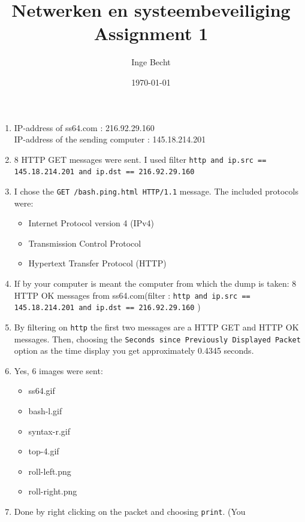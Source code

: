 \documentclass[12pt]{article} %
\begin{document}
\title{Netwerken en systeembeveiliging\\ Assignment 1}
\author{Inge Becht}
\date{\today}

\maketitle
 \begin{enumerate}
     \item IP-address of ss64.com : 216.92.29.160\\
           IP-address of the sending computer : 145.18.214.201\\
    \item 8 HTTP GET messages were sent.
        I used filter \texttt{http and ip.src == 145.18.214.201 and ip.dst ==
        216.92.29.160}\
    \item 
        I chose the \texttt{GET /bash.ping.html HTTP/1.1} message. The included
        protocols were:
        \begin{itemize}
            \item Internet Protocol version 4 (IPv4)
            \item Transmission Control Protocol
            \item Hypertext Transfer Protocol (HTTP)
        \end{itemize}
    \item If by your computer is meant the computer from which the dump is taken: 
        8 HTTP OK messages from ss64.com(filter : \texttt{http and ip.src ==
        145.18.214.201 and ip.dst == 216.92.29.160} )
    \item{ By filtering on \texttt{http} the first two messages are a HTTP GET and
            HTTP OK messages. Then, choosing the \texttt{Seconds since Previously
            Displayed Packet} option as the time display you get approximately
            0.4345 seconds.
         }
    \item Yes, 6 images were sent:
        \begin{itemize}
            \item ss64.gif
            \item bash-l.gif
            \item syntax-r.gif
            \item top-4.gif
            \item roll-left.png
            \item roll-right.png
        \end{itemize}
    \item Done by right clicking on the packet and choosing \texttt{print}. (You

\end{enumerate}
\end{document}

